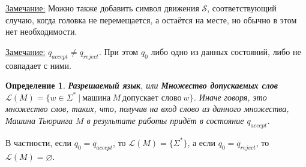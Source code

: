 \documentclass[a4paper,12pt]{article}
\newtheorem{definition}{Определение}
\newcommand{\note}{\underline{Замечание:} }
\begin{document}
\note{Можно также добавить символ движения $\mathcal{S}$, соответствующий случаю, когда головка не перемещается, а остаётся на месте, но обычно в этом нет необходимости.}

\note{$q_{accept} \neq q_{reject}$. При этом $q_0$ либо одно из данных состояний, либо не совпадает с ними.}

\begin{definition}
\textbf{Разрешаемый язык}, или \textbf{Множество допускаемых слов} $\mathscr{L}(M) = \{w \in \Sigma^*\ |\ \text{машина}\ M\ \text{допускает слово}\ w\}$. Иначе говоря, это множество слов, таких, что, получив на вход слово из данного множества, Машина Тьюринга $M$ в результате работы придёт в состояние $q_{accept}$.
\end{definition}

В частности, если $q_0 = q_{accept}$, то $\mathscr{L}(M) = \{\Sigma^*\}$, а если $q_0 = q_{reject}$, то $\mathscr{L}(M) = \varnothing$.
\end{document}
